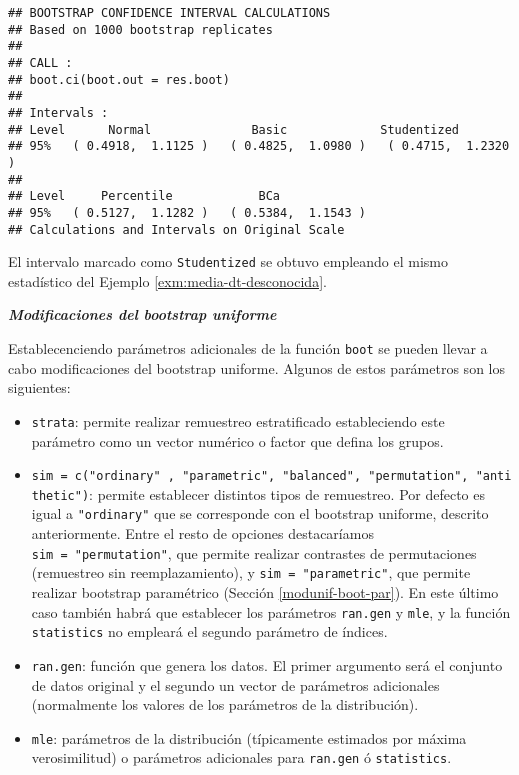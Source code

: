 \documentclass[]{book}
\theoremstyle{break}
\theoremstyle{definition}
\theoremstyle{definition}
\theoremstyle{definition}
\theoremstyle{remark}
\begin{document}
\begin{verbatim}
## BOOTSTRAP CONFIDENCE INTERVAL CALCULATIONS
## Based on 1000 bootstrap replicates
## 
## CALL : 
## boot.ci(boot.out = res.boot)
## 
## Intervals : 
## Level      Normal              Basic             Studentized     
## 95%   ( 0.4918,  1.1125 )   ( 0.4825,  1.0980 )   ( 0.4715,  1.2320 )  
## 
## Level     Percentile            BCa          
## 95%   ( 0.5127,  1.1282 )   ( 0.5384,  1.1543 )  
## Calculations and Intervals on Original Scale
\end{verbatim}

El intervalo marcado como \texttt{Studentized} se obtuvo empleando el
mismo estadístico del Ejemplo \ref{exm:media-dt-desconocida}.

\textbf{\emph{Modificaciones del bootstrap uniforme}}

Establecenciendo parámetros adicionales de la función \texttt{boot} se
pueden llevar a cabo modificaciones del bootstrap uniforme. Algunos de
estos parámetros son los siguientes:

\begin{itemize}
\item
  \texttt{strata}: permite realizar remuestreo estratificado
  estableciendo este parámetro como un vector numérico o factor que
  defina los grupos.
\item
  \texttt{sim\ =\ c("ordinary"\ ,\ "parametric",\ "balanced",\ "permutation",\ "antithetic")}:
  permite establecer distintos tipos de remuestreo. Por defecto es igual
  a \texttt{"ordinary"} que se corresponde con el bootstrap uniforme,
  descrito anteriormente. Entre el resto de opciones destacaríamos
  \texttt{sim\ =\ "permutation"}, que permite realizar contrastes de
  permutaciones (remuestreo sin reemplazamiento), y
  \texttt{sim\ =\ "parametric"}, que permite realizar bootstrap
  paramétrico (Sección \ref{modunif-boot-par}). En este último caso
  también habrá que establecer los parámetros \texttt{ran.gen} y
  \texttt{mle}, y la función \texttt{statistics} no empleará el segundo
  parámetro de índices.
\item
  \texttt{ran.gen}: función que genera los datos. El primer argumento
  será el conjunto de datos original y el segundo un vector de
  parámetros adicionales (normalmente los valores de los parámetros de
  la distribución).
\item
  \texttt{mle}: parámetros de la distribución (típicamente estimados por
  máxima verosimilitud) o parámetros adicionales para \texttt{ran.gen} ó
  \texttt{statistics}.
\end{itemize}
\end{document}
